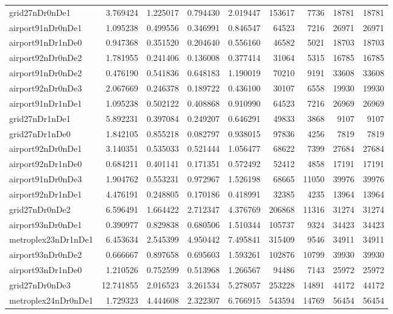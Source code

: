 \begin{longtable}{|l|r|r|r|r|r|r|r|r|}
grid27nDr0nDe1 & 3.769424 & 1.225017 & 0.794430 & 2.019447 & 153617 & 7736 & 18781 & 18781 \\
airport91nDr0nDe1 & 1.095238 & 0.499556 & 0.346991 & 0.846547 & 64523 & 7216 & 26971 & 26971 \\
airport91nDr1nDe0 & 0.947368 & 0.351520 & 0.204640 & 0.556160 & 46582 & 5021 & 18703 & 18703 \\
airport92nDr0nDe2 & 1.781955 & 0.241406 & 0.136008 & 0.377414 & 31064 & 5315 & 16785 & 16785 \\
airport91nDr0nDe2 & 0.476190 & 0.541836 & 0.648183 & 1.190019 & 70210 & 9191 & 33608 & 33608 \\
airport92nDr0nDe3 & 2.067669 & 0.246378 & 0.189722 & 0.436100 & 30107 & 6558 & 19930 & 19930 \\
airport91nDr1nDe1 & 1.095238 & 0.502122 & 0.408868 & 0.910990 & 64523 & 7216 & 26969 & 26969 \\
grid27nDr1nDe1 & 5.892231 & 0.397084 & 0.249207 & 0.646291 & 49833 & 3868 & 9107 & 9107 \\
grid27nDr1nDe0 & 1.842105 & 0.855218 & 0.082797 & 0.938015 & 97836 & 4256 & 7819 & 7819 \\
airport92nDr0nDe1 & 3.140351 & 0.535033 & 0.521444 & 1.056477 & 68622 & 7399 & 27684 & 27684 \\
airport92nDr1nDe0 & 0.684211 & 0.401141 & 0.171351 & 0.572492 & 52412 & 4858 & 17191 & 17191 \\
airport91nDr0nDe3 & 1.904762 & 0.553231 & 0.972967 & 1.526198 & 68665 & 11050 & 39976 & 39976 \\
airport92nDr1nDe1 & 4.476191 & 0.248805 & 0.170186 & 0.418991 & 32385 & 4235 & 13964 & 13964 \\
grid27nDr0nDe2 & 6.596491 & 1.664422 & 2.712347 & 4.376769 & 206868 & 11316 & 31274 & 31274 \\
airport93nDr0nDe1 & 0.390977 & 0.829838 & 0.680506 & 1.510344 & 105737 & 9324 & 34423 & 34423 \\
metroplex23nDr1nDe1 & 6.453634 & 2.545399 & 4.950442 & 7.495841 & 315409 & 9546 & 34911 & 34911 \\
airport93nDr0nDe2 & 0.666667 & 0.897658 & 0.695603 & 1.593261 & 102876 & 10799 & 39930 & 39930 \\
airport93nDr1nDe0 & 1.210526 & 0.752599 & 0.513968 & 1.266567 & 94486 & 7143 & 25972 & 25972 \\
grid27nDr0nDe3 & 12.741855 & 2.016523 & 3.261534 & 5.278057 & 253228 & 14891 & 44172 & 44172 \\
metroplex24nDr0nDe1 & 1.729323 & 4.444608 & 2.322307 & 6.766915 & 543594 & 14769 & 56454 & 56454 \\

\end{longtable}
